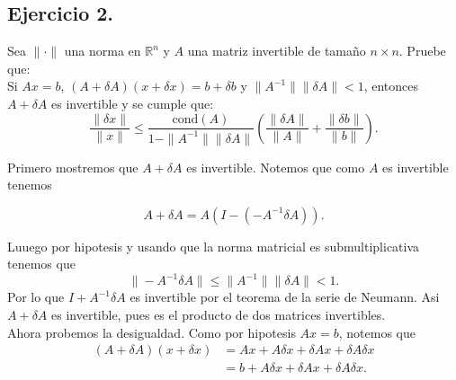 
\subsection*{Ejercicio 2.}
Sea $\| \cdot \|$ una norma en $\mathbb{R}^n$ y $A$ una matriz invertible de tamaño $n \times n$. Pruebe que:\\

Si $Ax = b$, $(A + \delta A)(x + \delta x) = b + \delta b$ y $\|A^{-1}\| \|\delta A\| < 1$, entonces $A + \delta A$ es invertible y se cumple que:
\[
\frac{\|\delta x\|}{\|x\|} \leq \frac{\text{cond}(A)}{1 - \|A^{-1}\| \|\delta A\|} \left( \frac{\|\delta A\|}{\|A\|} + \frac{\|\delta b\|}{\|b\|} \right).
\]

\begin{sproof}
    Primero  mostremos que $A+\delta A$ es invertible. Notemos que como $A$ es invertible tenemos

     $$A+\delta A=A(I-(-A^{-1}\delta A)).$$

     Luuego por hipotesis y usando que la norma matricial es submultiplicativa tenemos que
     $$\|-A^{-1}\delta A\|\leq\|A^{-1}\|\|\delta A\|<1.$$
     Por lo que $I+A^{-1}\delta A$ es invertible por el teorema de la serie de Neumann. Asi $A+\delta A$ es invertible, pues es el producto de dos matrices invertibles.\\

     Ahora probemos la desigualdad. Como por hipotesis $Ax=b$, notemos que 
     \begin{align*}
     (A+\delta A)(x+\delta x)&=Ax+A\delta x+\delta Ax+\delta A\delta x\\
     &=b+A\delta x+\delta Ax+\delta A\delta x.
     \end{align*}


\end{sproof}
